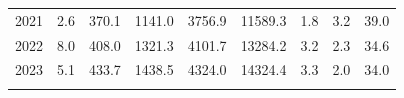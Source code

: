 \documentclass[openany]{book}
\begin{document}
\begin{table}[htbp]
{\begin{tabular}{ccccccccc}
\rowcolor[HTML]{F8F9FA} 
{\color[HTML]{202122} 2021}        & {\color[HTML]{202122} 2.6}                                                                  & {\color[HTML]{202122} 370.1}                                                                        & {\color[HTML]{202122} 1141.0}                                                                   & {\color[HTML]{202122} 3756.9}                                                                              & {\color[HTML]{202122} 11589.3}                                                                         & {\color[HTML]{202122} 1.8}                                                                            & {\color[HTML]{202122} 3.2}                                                                               & {\color[HTML]{202122} 39.0}                                                                              \\
\rowcolor[HTML]{F8F9FA} 
{\color[HTML]{202122} 2022}        & {\color[HTML]{202122} 8.0}                                                                  & {\color[HTML]{202122} 408.0}                                                                        & {\color[HTML]{202122} 1321.3}                                                                   & {\color[HTML]{202122} 4101.7}                                                                              & {\color[HTML]{202122} 13284.2}                                                                         & {\color[HTML]{202122} 3.2}                                                                            & {\color[HTML]{202122} 2.3}                                                                               & {\color[HTML]{202122} 34.6}                                                                              \\
\rowcolor[HTML]{F8F9FA} 
{\color[HTML]{202122} 2023}        & {\color[HTML]{202122} 5.1}                                                                  & {\color[HTML]{202122} 433.7}                                                                        & {\color[HTML]{202122} 1438.5}                                                                   & {\color[HTML]{202122} 4324.0}                                                                              & {\color[HTML]{202122} 14324.4}                                                                         & {\color[HTML]{202122} 3.3}                                                                            & {\color[HTML]{202122} 2.0}                                                                               & {\color[HTML]{202122} 34.0}                                                                              \\
\rowcolor[HTML]{F8F9FA} 
\end{tabular}
}
\end{table}
\end{document}
